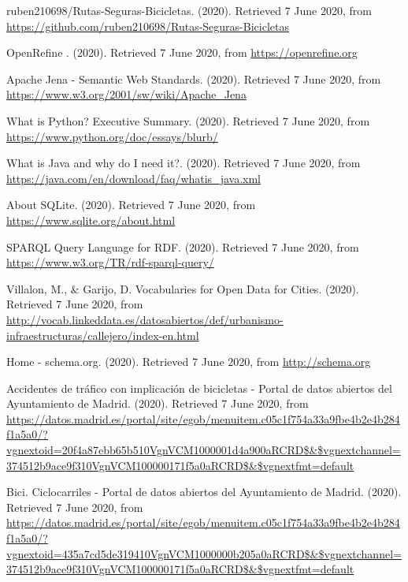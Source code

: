 \begin{thebibliography}{99}

 ruben210698/Rutas-Seguras-Bicicletas. (2020). Retrieved 7 June 2020, from   \url{https://github.com/ruben210698/Rutas-Seguras-Bicicletas}

 OpenRefine . (2020). Retrieved 7 June 2020, from \url{https://openrefine.org}

 Apache Jena - Semantic Web Standards. (2020). Retrieved 7 June 2020, from \url{https://www.w3.org/2001/sw/wiki/Apache_Jena}

 What is Python? Executive Summary. (2020). Retrieved 7 June 2020, from \url{https://www.python.org/doc/essays/blurb/}

 What is Java and why do I need it?. (2020). Retrieved 7 June 2020, from \url{https://java.com/en/download/faq/whatis_java.xml}

 About SQLite. (2020). Retrieved 7 June 2020, from \url{https://www.sqlite.org/about.html}

 SPARQL Query Language for RDF. (2020). Retrieved 7 June 2020, from \url{https://www.w3.org/TR/rdf-sparql-query/}






 Villalon, M., $\&$ Garijo, D. Vocabularies for Open Data for Cities. (2020). Retrieved 7 June 2020, from \url{http://vocab.linkeddata.es/datosabiertos/def/urbanismo-infraestructuras/callejero/index-en.html}

 Home - schema.org. (2020). Retrieved 7 June 2020, from \url{http://schema.org}

 Accidentes de tráfico con implicación de bicicletas - Portal de datos abiertos del Ayuntamiento de Madrid. (2020). Retrieved 7 June 2020, from \url{https://datos.madrid.es/portal/site/egob/menuitem.c05c1f754a33a9fbe4b2e4b284f1a5a0/?vgnextoid=20f4a87ebb65b510VgnVCM1000001d4a900aRCRD$\&$vgnextchannel=374512b9ace9f310VgnVCM100000171f5a0aRCRD$\&$vgnextfmt=default}

 Bici. Ciclocarriles - Portal de datos abiertos del Ayuntamiento de Madrid. (2020). Retrieved 7 June 2020, from \url{https://datos.madrid.es/portal/site/egob/menuitem.c05c1f754a33a9fbe4b2e4b284f1a5a0/?vgnextoid=435a7cd5de319410VgnVCM1000000b205a0aRCRD$\&$vgnextchannel=374512b9ace9f310VgnVCM100000171f5a0aRCRD$\&$vgnextfmt=default}


\end{thebibliography}
